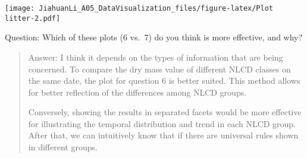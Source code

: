 \documentclass[
]{article}
\begin{document}
\texttt{[image: JiahuanLi\_A05\_DataVisualization\_files/figure-latex/Plot litter-2.pdf]}

Question: Which of these plots (6 vs.~7) do you think is more effective,
and why?

\begin{quote}
Answer: I think it depends on the types of information that are being
concerned. To compare the dry mass value of different NLCD classes on
the same date, the plot for question 6 is better suited. This method
allows for better reflection of the differences among NLCD groups.

Conversely, showing the results in separated facets would be more
effective for illustrating the temporal distribution and trend in each
NLCD group. After that, we can intuitively know that if there are
universal rules shown in different groups.
\end{quote}
\end{document}
